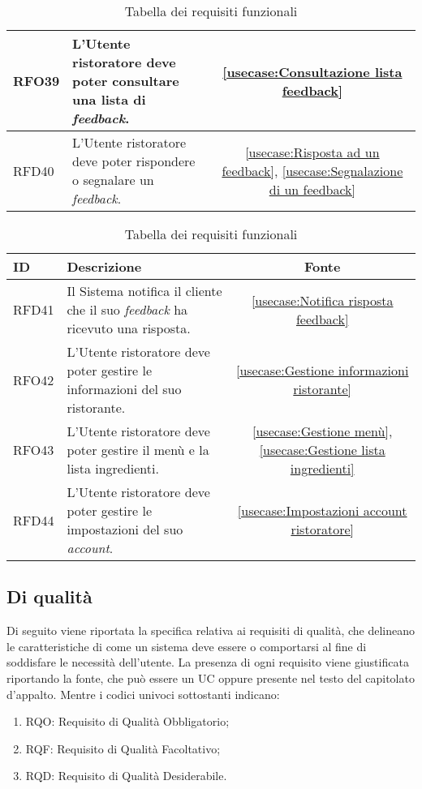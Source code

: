 \begin{table}[H]
\begin{tabularx}{\textwidth}{l|X|c}
		\hline
		RFO39       & L'Utente ristoratore deve poter consultare una lista di \textit{feedback}.										            &  \autoref{usecase:Consultazione lista feedback}           \\
		\hline
		RFD40       & L'Utente ristoratore deve poter rispondere o segnalare un \textit{feedback}.                          				 		&  \autoref{usecase:Risposta ad un feedback}, \autoref{usecase:Segnalazione di un feedback}          \\
		\hline
\end{tabularx}
\caption{Tabella dei requisiti funzionali}
\end{table}


\begin{table}[H]
	\renewcommand{\arraystretch}{1.5}
	\centering
	\begin{tabularx}{\textwidth}{l|X|c}
		\textbf{ID} & \textbf{Descrizione}                                                                                                      & \textbf{Fonte} \\
		\hline
		RFD41       & Il Sistema notifica il cliente che il suo \textit{feedback} ha ricevuto una risposta.                          				&  \autoref{usecase:Notifica risposta feedback}           \\
		\hline
		RFO42       & L'Utente ristoratore deve poter gestire le informazioni del suo ristorante.												    &  \autoref{usecase:Gestione informazioni ristorante}           \\
		\hline
		RFO43       & L'Utente ristoratore deve poter gestire il menù e la lista ingredienti.												        &  \autoref{usecase:Gestione menù}, \autoref{usecase:Gestione lista ingredienti}           \\
		\hline
		RFD44       & L'Utente ristoratore deve poter gestire le impostazioni del suo \textit{account}.												&  \autoref{usecase:Impostazioni account ristoratore}           \\
		\hline
\end{tabularx}
\caption{Tabella dei requisiti funzionali}
\end{table}


\subsection{Di qualità}

Di seguito viene riportata la specifica relativa ai requisiti di qualità, che delineano le caratteristiche di come un sistema 
deve essere o comportarsi al fine di soddisfare le necessità dell'utente.
La presenza di ogni requisito viene giustificata riportando la fonte, che può essere un UC oppure presente 
nel testo del capitolato d'appalto. Mentre i codici univoci sottostanti indicano:
\begin{enumerate}
	\item RQO: Requisito di Qualità Obbligatorio;
	\item RQF: Requisito di Qualità Facoltativo;
	\item RQD: Requisito di Qualità Desiderabile.
\end{enumerate}

